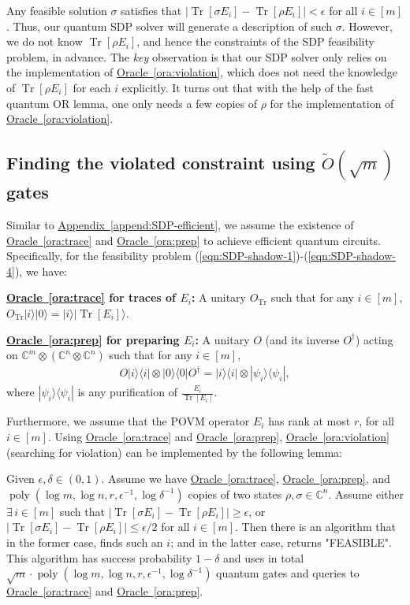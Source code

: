 \documentclass[a4paper,UKenglish,cleveref, autoref]{lipics-v2019}
\theoremstyle{remark}
\numberwithin{equation}{section}
\numberwithin{oracle}{section}
\numberwithin{remark}{section}
\newcommand{\eqn}[1]{(\ref{eqn:#1})}
\newcommand{\ora}[1]{\hyperref[ora:#1]{Oracle~\ref*{ora:#1}}}
\newcommand{\append}[1]{\hyperref[append:#1]{Appendix~\ref*{append:#1}}}
\def\>{\rangle}
\def\<{\langle}
\newcommand{\range}[1]{[#1]}
\newcommand{\C}{\ensuremath{\mathbb{C}}}
\DeclareMathOperator{\poly}{poly}
\DeclareMathOperator{\Tr}{Tr}
\newcommand{\hd}[1]{\vspace{2mm} \noindent \textbf{#1}}
\begin{document}
\noindent Any feasible solution $\sigma$ satisfies that $|\Tr[\sigma E_{i}]-\Tr[\rho E_{i}]|<\epsilon$ for all $i\in\range{m}$.
Thus, our quantum SDP solver will generate a description of such $\sigma$. However, we do not know $\Tr[\rho E_{i}]$, and hence the constraints of the SDP feasibility problem, in advance.
The \emph{key} observation is that our SDP solver only relies on the implementation of \ora{violation},
which does not need the knowledge of $\Tr[\rho E_{i}]$ for each $i$ explicitly.
It turns out that with the help of the fast quantum OR lemma, one only needs a few copies of $\rho$ for the implementation of \ora{violation}.

\subsection{Finding the violated constraint using $\tilde{O}(\sqrt{m})$ gates}
Similar to \append{SDP-efficient}, we assume the existence of \ora{trace} and \ora{prep} to achieve efficient quantum circuits. Specifically, for the feasibility problem \eqn{SDP-shadow-1}-\eqn{SDP-shadow-4}, we have:

\hd{\ora{trace} for traces of $E_{i}$:} A unitary $O_{\Tr}$ such that for any $i\in\range{m}$, $O_{\Tr}|i\>|0\>=|i\>|\Tr[E_{i}]\>$.

\hd{\ora{prep} for preparing $E_{i}$:} A unitary $O$ (and its inverse $O^\dagger$) acting on $\C^{m}\otimes(\C^{n} \otimes \C^{n})$ such that for any $i\in\range{m}$,
\begin{align}
O|i\>\<i|\otimes |0\>\<0|O^{\dagger}=|i\>\<i|\otimes |\psi_i\>\<\psi_i|,
\end{align}
where $|\psi_i\>\<\psi_i|$ is any purification of $\frac{E_{i}}{\Tr[E_{i}]}$.

Furthermore, we assume that the POVM operator $E_{i}$ has rank at most $r$, for all $i\in\range{m}$. Using \ora{trace} and \ora{prep}, \ora{violation} (searching for violation) can be implemented by the following lemma:
\begin{lemma}\label{lem:oracle-implementation-learning}
Given $\epsilon,\delta\in (0,1)$. Assume we have \ora{trace}, \ora{prep}, and $\poly(\log m,\log n,r,\epsilon^{-1},\log\delta^{-1})$ copies of two states $\rho,\sigma\in\C^{n}$. Assume either $\exists\,i \in [m]$ such that $|\Tr[\sigma E_{i}]-\Tr[\rho E_{i}]|\geq\epsilon$, or  $|\Tr[\sigma E_{i}]-\Tr[\rho E_{i}]|\leq\epsilon/2$ for all $i\in\range{m}$. Then there is an algorithm that in the former case, finds such an $i$; and in the latter case, returns "FEASIBLE". This algorithm has success probability $1-\delta$ and uses in total $\sqrt{m}\cdot\poly(\log m,\log n,r,\epsilon^{-1},\log\delta^{-1})$ quantum gates and queries to \ora{trace} and \ora{prep}.
\end{lemma}
\end{document}
